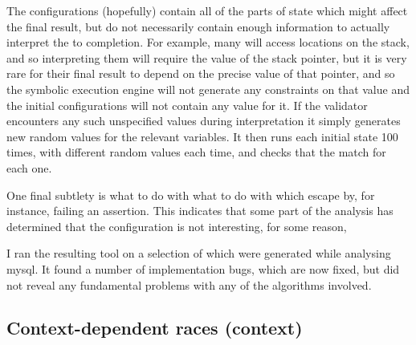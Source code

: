 The configurations (hopefully) contain all of the parts of
{\StateMachine} state which might affect the final result, but do not
necessarily contain enough information to actually interpret the
{\StateMachines} to completion.  For example, many {\StateMachines}
will access locations on the stack, and so interpreting them will
require the value of the stack pointer, but it is very rare for their
final result to depend on the precise value of that pointer, and so
the symbolic execution engine will not generate any constraints on
that value and the initial configurations will not contain any value
for it.  If the validator encounters any such unspecified values
during {\StateMachine} interpretation it simply generates new random
values for the relevant variables.  It then runs each initial state
100 times, with different random values each time, and checks that the
{\StateMachines} match for each one.

One final subtlety is what to do with what to do with {\StateMachines}
which escape by, for instance, failing an assertion.  This indicates
that some part of the analysis has determined that the configuration
is not interesting, for some reason, 

I ran the resulting tool on a selection of {\StateMachines} which were
generated while analysing mysql.  It found a number of implementation
bugs, which are now fixed, but did not reveal any fundamental problems
with any of the algorithms involved.

\subsection{Context-dependent races (context)}

